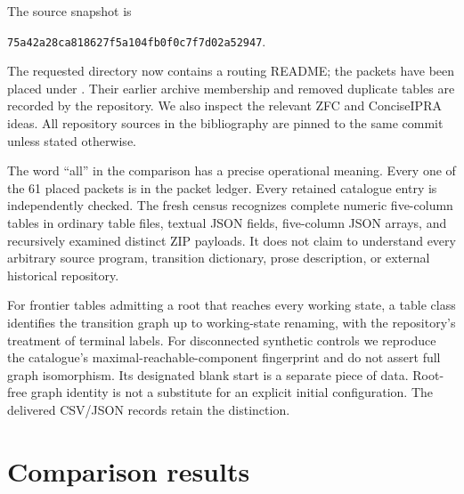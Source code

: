 \documentclass[11pt]{article}
\begin{document}
The source snapshot is
\begin{center}\small
\nolinkurl{75a42a28ca818627f5a104fb0f0c7f7d02a52947}.
\end{center}
The requested  directory now contains a routing README; the packets have been placed under
. Their earlier archive membership and removed duplicate tables are recorded by the repository. We also inspect the relevant ZFC and ConciseIPRA ideas. All repository sources in the bibliography are pinned to the same commit unless stated otherwise.\cite{repo,packets,machines}

The word ``all'' in the comparison has a precise operational meaning. Every one of the 61 placed packets is in the packet ledger. Every retained catalogue entry is independently checked. The fresh census recognizes complete numeric five-column tables in ordinary table files, textual JSON fields, five-column JSON arrays, and recursively examined distinct ZIP payloads. It does not claim to understand every arbitrary source program, transition dictionary, prose description, or external historical repository.

For frontier tables admitting a root that reaches every working state, a table class identifies the transition graph up to working-state renaming, with the repository's treatment of terminal labels. For disconnected synthetic controls we reproduce the catalogue's maximal-reachable-component fingerprint and do not assert full graph isomorphism. Its designated blank start is a separate piece of data. Root-free graph identity is not a substitute for an explicit initial configuration. The delivered CSV/JSON records retain the distinction.

\section{Comparison results}
\end{document}
